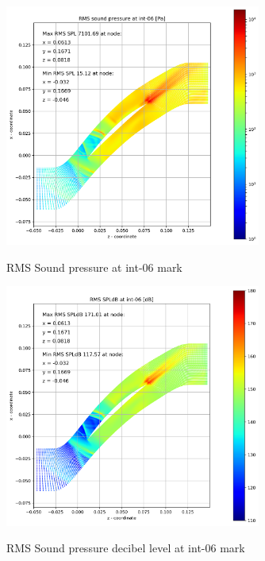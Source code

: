 \begin{figure}[ht]
  \centering
  \includegraphics[width=0.75\textwidth]{Figures/int-06-rms-spl.png} \label{int-06-rms-spl}
  \caption{RMS Sound pressure at int-06 mark}
  
  \vspace*{\floatsep}%

  \includegraphics[width=0.75\textwidth]{Figures/int-06-rms-spldb.png} \label{int-06-rms-spldb}
  \caption{RMS Sound pressure decibel level at int-06 mark}
\end{figure}
